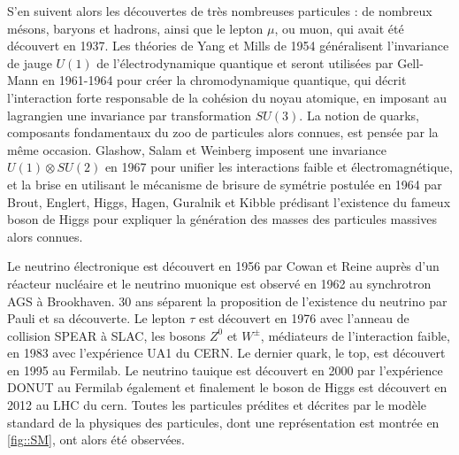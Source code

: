 		    S'en suivent alors les découvertes de très nombreuses particules : de nombreux mésons, baryons et  hadrons, ainsi que le lepton $\mu$, ou muon, qui avait été découvert en 1937\cite{Street1937}. Les théories de Yang et Mills de 1954\cite{Yang1954} généralisent l'invariance de jauge $U(1)$ de l'électrodynamique quantique et seront utilisées par Gell-Mann en 1961-1964\cite{Glashow1961,Gell-Mann1964} pour créer la chromodynamique quantique, qui décrit l'interaction forte responsable de la cohésion du noyau atomique, en imposant au lagrangien une invariance par transformation $SU(3)$. La notion de quarks, composants fondamentaux du zoo de particules alors connues, est pensée par la même occasion. Glashow, Salam et Weinberg imposent une invariance $U(1)\otimes SU(2)$ en 1967\cite{Glashow1961a,Salam1964,Weinberg1967} pour unifier les interactions faible et électromagnétique, et la brise en utilisant le mécanisme de brisure de symétrie postulée en 1964 par  Brout, Englert, Higgs, Hagen, Guralnik et Kibble\cite{Englert1964,Higgs1964,Higgs1964a,Kibble1967} prédisant l'existence du fameux boson de Higgs pour expliquer la génération des masses des particules massives alors connues. 
		    
		    Le neutrino électronique est découvert en 1956 par Cowan et Reine\cite{Cowan1956} auprès d'un réacteur nucléaire et le neutrino muonique est observé en 1962\cite{Danby1962} au synchrotron AGS à Brookhaven. 30 ans séparent la proposition de l'existence du neutrino par Pauli et sa découverte. Le lepton $\tau$ est découvert en 1976\cite{Perl1975} avec l'anneau de collision SPEAR à SLAC, les bosons $Z^0$ et $W^{\pm}$, médiateurs de l'interaction faible, en 1983\cite{Arnison1983,Arnison1983a} avec l'expérience UA1 du CERN. Le dernier quark, le top, est découvert en 1995\cite{Collaboration1995} au Fermilab. Le neutrino tauique est découvert en 2000 par l'expérience DONUT\cite{Collaboration2000} au Fermilab également et finalement le boson de Higgs est découvert en 2012 au LHC du \gls{cern}\cite{Collaboration2012}. Toutes les particules prédites et décrites par le modèle standard de la physiques des particules, dont une représentation est montrée en \autoref{fig::SM}, ont alors été observées. 
		    
